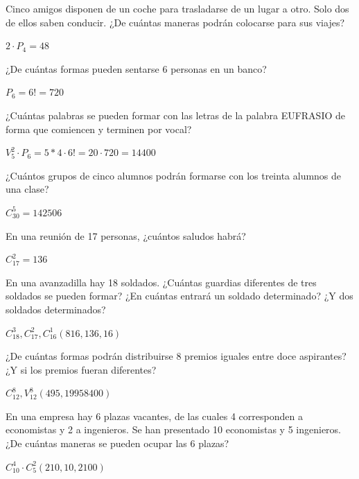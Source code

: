 \documentclass[spanish, 10pt]{exam}
\begin{document}
\begin{questions}
\question Cinco amigos disponen de un coche para trasladarse de un lugar
a otro. Solo dos de ellos saben conducir. ¿De cuántas maneras podrán colocarse para sus viajes?
\begin{solution}
$2\cdot P_4=48$
\end{solution}


\question ¿De cuántas formas pueden sentarse 6 personas en un banco?
\begin{solution}
$P_6= 6!=720$
\end{solution}

\question ¿Cuántas palabras se pueden formar con las letras de la palabra EUFRASIO de forma que comiencen y terminen por vocal?
\begin{solution}
$V_5^2\cdot P_6= 5*4 \cdot 6!=20\cdot720=14400 $
\end{solution}


\question ¿Cuántos grupos de cinco alumnos podrán formarse con los
treinta alumnos de una clase?
\begin{solution}
$C_30^5=142506 $
\end{solution}

\question En una reunión de 17 personas, ¿cuántos saludos habrá?
\begin{solution}
$C_17^2=136 $
\end{solution}

\question En una avanzadilla hay 18 soldados. ¿Cuántas guardias diferentes de tres soldados se pueden formar? ¿En cuántas entrará un
soldado determinado? ¿Y dos soldados determinados?
\begin{solution}
$C_18^3, C_17^2, C_16^1 (816, 136, 16)$
\end{solution}

\question ¿De cuántas formas podrán distribuirse 8 premios iguales entre doce aspirantes? ¿Y si los premios fueran diferentes?
\begin{solution}
$C_12^8, V_12^8 (495, 19958400)$
\end{solution}

\question En una empresa hay 6 plazas vacantes, de las cuales 4 corresponden a economistas y 2 a ingenieros. Se han presentado 10 economistas y 5 ingenieros. ¿De cuántas maneras se pueden ocupar las 6 plazas?
\begin{solution}
$C_10^4 \cdot C_5^2 (210, 10, 2100)$
\end{solution}

\end{questions}
\end{document}
